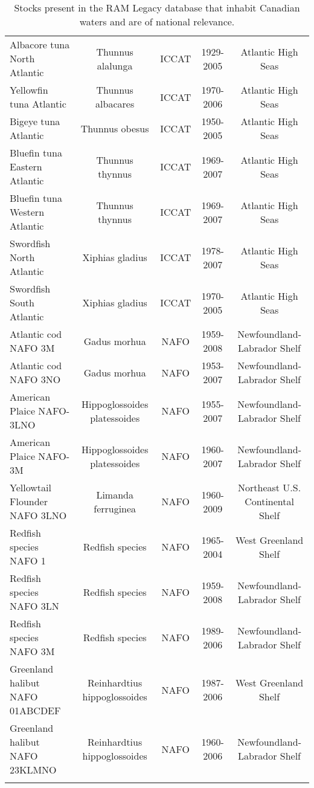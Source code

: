 \begin{longtable}{p{3cm}cccc}
  Albacore tuna North Atlantic & Thunnus alalunga & ICCAT & 1929-2005 & Atlantic High Seas \\ 
  Yellowfin tuna Atlantic & Thunnus albacares & ICCAT & 1970-2006 & Atlantic High Seas \\ 
  Bigeye tuna Atlantic & Thunnus obesus & ICCAT & 1950-2005 & Atlantic High Seas \\ 
  Bluefin tuna Eastern Atlantic & Thunnus thynnus & ICCAT & 1969-2007 & Atlantic High Seas \\ 
  Bluefin tuna Western Atlantic & Thunnus thynnus & ICCAT & 1969-2007 & Atlantic High Seas \\ 
  Swordfish North Atlantic & Xiphias gladius & ICCAT & 1978-2007 & Atlantic High Seas \\ 
  Swordfish South Atlantic & Xiphias gladius & ICCAT & 1970-2005 & Atlantic High Seas \\ 
  Atlantic cod NAFO 3M & Gadus morhua & NAFO & 1959-2008 & Newfoundland-Labrador Shelf \\ 
  Atlantic cod NAFO 3NO & Gadus morhua & NAFO & 1953-2007 & Newfoundland-Labrador Shelf \\ 
  American Plaice NAFO-3LNO & Hippoglossoides platessoides & NAFO & 1955-2007 & Newfoundland-Labrador Shelf \\ 
  American Plaice NAFO-3M & Hippoglossoides platessoides & NAFO & 1960-2007 & Newfoundland-Labrador Shelf \\ 
  Yellowtail Flounder NAFO 3LNO & Limanda ferruginea & NAFO & 1960-2009 & Northeast U.S. Continental Shelf \\ 
  Redfish species NAFO 1 & Redfish species & NAFO & 1965-2004 & West Greenland Shelf \\ 
  Redfish species NAFO 3LN & Redfish species & NAFO & 1959-2008 & Newfoundland-Labrador Shelf \\ 
  Redfish species NAFO 3M & Redfish species & NAFO & 1989-2006 & Newfoundland-Labrador Shelf \\ 
  Greenland halibut NAFO 01ABCDEF & Reinhardtius hippoglossoides & NAFO & 1987-2006 & West Greenland Shelf \\ 
  Greenland halibut NAFO 23KLMNO & Reinhardtius hippoglossoides & NAFO & 1960-2006 & Newfoundland-Labrador Shelf \\ 
   \hline
\hline
\caption{Stocks present in the RAM Legacy database that inhabit Canadian waters and are of national relevance.}
\label{tab:crosshair}
\end{longtable}
